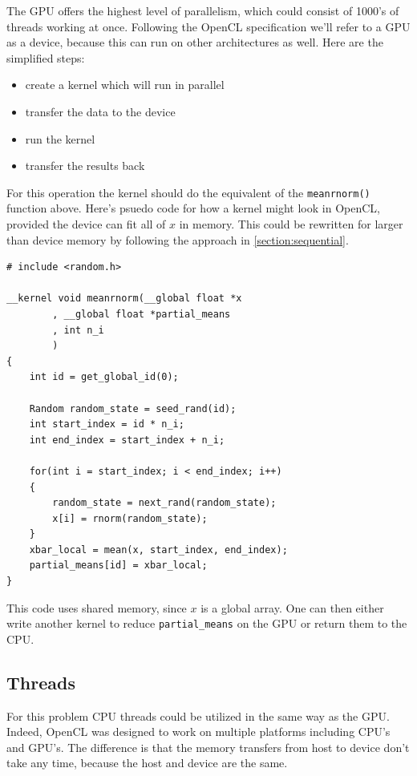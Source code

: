 \documentclass[12pt]{article}
\begin{document}
The GPU offers the highest level of parallelism, which could consist of
1000's of threads working at once. Following the OpenCL specification we'll
refer to a GPU as a device, because this can run on other architectures as
well. Here are the simplified steps:

\begin{itemize}
    \item create a kernel which will run in parallel
    \item transfer the data to the device
    \item run the kernel
    \item transfer the results back
\end{itemize}

For this operation the kernel should do the equivalent of the
\texttt{meanrnorm()} function above.  Here's psuedo code for how a kernel
might look in OpenCL, provided the device can fit all of $x$ in memory.
This could be rewritten for larger than device memory by following the
approach in \ref{section:sequential}.

\begin{verbatim}
# include <random.h>

__kernel void meanrnorm(__global float *x
        , __global float *partial_means
        , int n_i
        )
{
    int id = get_global_id(0);

    Random random_state = seed_rand(id);
    int start_index = id * n_i;
    int end_index = start_index + n_i;

    for(int i = start_index; i < end_index; i++)
    {
        random_state = next_rand(random_state);
        x[i] = rnorm(random_state);
    }
    xbar_local = mean(x, start_index, end_index);
    partial_means[id] = xbar_local;
}
\end{verbatim}

This code uses shared memory, since $x$ is a global array.
One can then either write another kernel to reduce
\texttt{partial\_means} on the GPU or return them to the CPU.

\subsection{Threads}

For this problem CPU threads could be utilized in the same way as the GPU.
Indeed, OpenCL was designed to work on multiple platforms including CPU's
and GPU's. The difference is that the memory transfers from host to device
don't take any time, because the host and device are the same.
\end{document}
